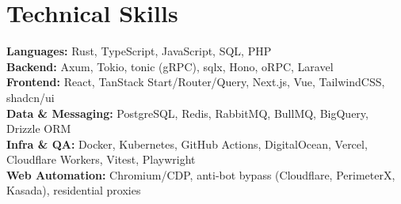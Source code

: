 \section*{Technical Skills}
\noindent\textbf{Languages:} Rust, TypeScript, JavaScript, SQL, PHP \\
\textbf{Backend:} Axum, Tokio, tonic (gRPC), sqlx, Hono, oRPC, Laravel \\
\textbf{Frontend:} React, TanStack Start/Router/Query, Next.js, Vue, TailwindCSS, shadcn/ui \\
\textbf{Data \& Messaging:} PostgreSQL, Redis, RabbitMQ, BullMQ, BigQuery, Drizzle ORM \\
\textbf{Infra \& QA:} Docker, Kubernetes, GitHub Actions, DigitalOcean, Vercel, Cloudflare Workers, Vitest, Playwright \\
\textbf{Web Automation:} Chromium/CDP, anti-bot bypass (Cloudflare, PerimeterX, Kasada), residential proxies
